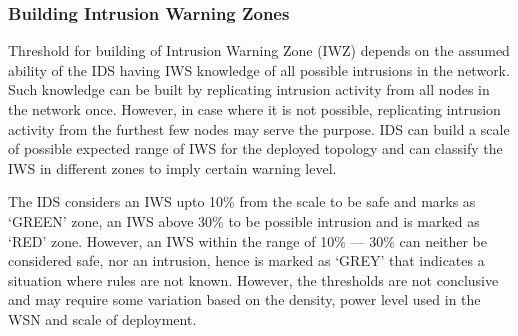 \documentclass[conference,final]{IEEEtran}
\begin{document}
\subsubsection{Building Intrusion Warning Zones}
\label{ssc:iw_zone}

Threshold for building of Intrusion Warning Zone (IWZ) depends on the assumed ability of the IDS having IWS knowledge of all possible intrusions in the network.
Such knowledge can be built by replicating intrusion activity from all nodes in the network once.
However, in case where it is not possible, replicating intrusion activity from the furthest few nodes may serve the purpose.
IDS can build a scale of possible expected range of IWS for the deployed topology and can classify the IWS in different zones to imply certain warning level.

The IDS considers an IWS upto 10\% from the scale to be safe and marks as `GREEN' zone, an IWS above 30\% to be possible intrusion and is marked as `RED' zone.
However, an IWS within the range of 10\% --- 30\% can neither be considered safe, nor an intrusion, hence is marked as `GREY' that indicates a situation where rules are not known.
However, the thresholds are not conclusive and may require some variation based on the density, power level used in the WSN and scale of deployment.
\end{document}

